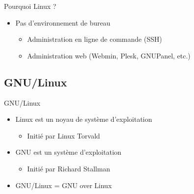 \begin{frame}{Pourquoi Linux ?}

\begin{itemize}
  \item Pas d'environnement de bureau
  \begin{itemize}
    \item Administration en ligne de commande (SSH)
    \item Administration web (Webmin, Plesk, GNUPanel, etc.)
  \end{itemize}

\end{itemize}

\end{frame}
\subsection{GNU/Linux}

\begin{frame}{GNU/Linux}

\begin{itemize}
\item Linux est un noyau de système d'exploitation
    \begin{itemize} \item Initié par Linux Torvald \end{itemize}
\item GNU est un système d'exploitation
    \begin{itemize} \item Initié par Richard Stallman \end{itemize}
\item GNU/Linux = GNU over Linux
\end{itemize}

\end{frame}



